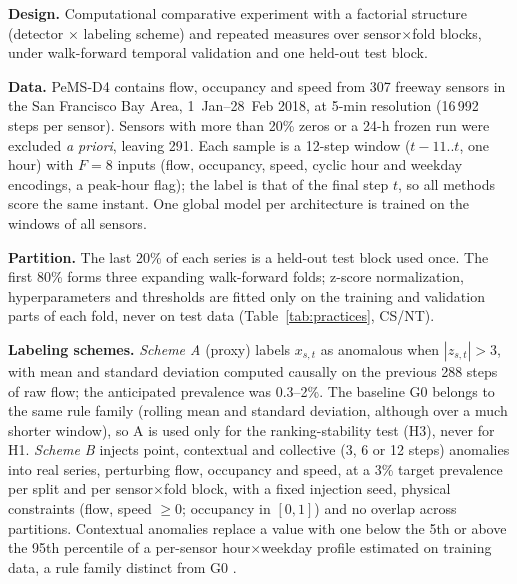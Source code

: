 \documentclass[conference]{IEEEtran}
\begin{document}
\textbf{Design.} Computational comparative experiment with a factorial
structure (detector $\times$ labeling scheme) and repeated measures over
sensor$\times$fold blocks, under walk-forward temporal validation and one
held-out test block.

\textbf{Data.} PeMS-D4 \cite{guo2019astgcn} contains flow, occupancy and
speed from 307 freeway sensors in the San Francisco Bay Area, 1~Jan--28~Feb
2018, at 5-min resolution (16\,992 steps per sensor). Sensors with more than
20\% zeros or a 24-h frozen run were excluded \emph{a priori}, leaving 291.
Each sample is a 12-step window ($t-11..t$, one hour) with $F=8$ inputs
(flow, occupancy, speed, cyclic hour and weekday encodings, a peak-hour
flag); the label is that of the final step $t$, so all methods score the same
instant. One global model per architecture is trained on the windows of all
sensors.

\textbf{Partition.} The last 20\% of each series is a held-out test block
used once. The first 80\% forms three expanding walk-forward folds; z-score
normalization, hyperparameters and thresholds are fitted only on the
training and validation parts of each fold, never on test data
(Table~\ref{tab:practices}, CS/NT).

\textbf{Labeling schemes.} \emph{Scheme A} (proxy) labels $x_{s,t}$ as
anomalous when $|z_{s,t}|>3$, with mean and standard deviation computed
causally on the previous 288 steps of raw flow; the anticipated prevalence was
0.3--2\%. The baseline G0 belongs to
the same rule family (rolling mean and standard deviation, although over a
much shorter window), so A is used only for the ranking-stability test (H3),
never for H1. \emph{Scheme B} injects point, contextual and collective
(3, 6 or 12 steps) anomalies into real series, perturbing flow, occupancy and
speed, at a 3\% target prevalence per split and per sensor$\times$fold block,
with a fixed injection seed, physical constraints (flow, speed $\geq 0$;
occupancy in $[0,1]$) and no overlap across partitions. Contextual anomalies
replace a value with one below the 5th or above the 95th percentile of a
per-sensor hour$\times$weekday profile estimated on training data, a rule
family distinct from G0 \cite{lai2021revisiting}.
\end{document}
